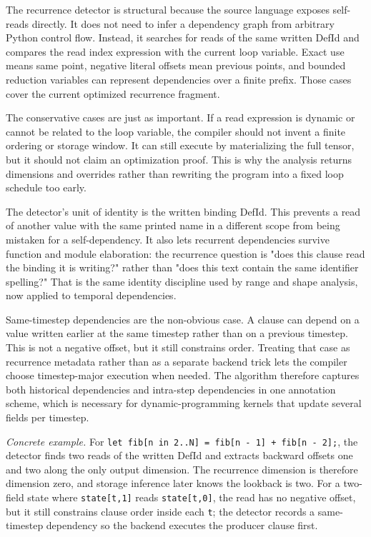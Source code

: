 The recurrence detector is structural because the source language exposes
self-reads directly. It does not need to infer a dependency graph from arbitrary
Python control flow. Instead, it searches for reads of the same written DefId
and compares the read index expression with the current loop variable. Exact
use means same point, negative literal offsets mean previous points, and
bounded reduction variables can represent dependencies over a finite prefix.
Those cases cover the current optimized recurrence fragment.

The conservative cases are just as important. If a read expression is dynamic
or cannot be related to the loop variable, the compiler should not invent a
finite ordering or storage window. It can still execute by materializing the
full tensor, but it should not claim an optimization proof. This is why the
analysis returns dimensions and overrides rather than rewriting the program
into a fixed loop schedule too early.

The detector's unit of identity is the written binding DefId. This prevents a
read of another value with the same printed name in a different scope from being
mistaken for a self-dependency. It also lets recurrent dependencies survive
function and module elaboration: the recurrence question is "does this clause
read the binding it is writing?" rather than "does this text contain the same
identifier spelling?" That is the same identity discipline used by range and
shape analysis, now applied to temporal dependencies.

Same-timestep dependencies are the non-obvious case. A clause can depend on a
value written earlier at the same timestep rather than on a previous timestep.
This is not a negative offset, but it still constrains order. Treating that case
as recurrence metadata rather than as a separate backend trick lets the compiler
choose timestep-major execution when needed. The algorithm therefore captures
both historical dependencies and intra-step dependencies in one annotation
scheme, which is necessary for dynamic-programming kernels that update several
fields per timestep.

\textit{Concrete example.} For \texttt{let fib[n in 2..N] = fib[n - 1] +
fib[n - 2];}, the detector finds two reads of the written DefId and extracts
backward offsets one and two along the only output dimension. The recurrence
dimension is therefore dimension zero, and storage inference later knows the
lookback is two. For a two-field state where \texttt{state[t,1]} reads
\texttt{state[t,0]}, the read has no negative offset, but it still constrains
clause order inside each \texttt{t}; the detector records a same-timestep
dependency so the backend executes the producer clause first.

